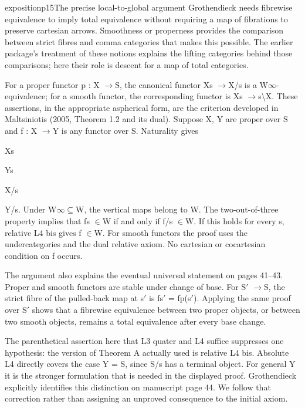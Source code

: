 \begin{dcomment}{exposition}{p15}{The precise local-to-global argument}
Grothendieck needs fibrewise equivalence to imply total equivalence without requiring a map of fibrations to preserve cartesian arrows. Smoothness or properness provides the comparison between strict fibres and comma categories that makes this possible. The earlier package’s treatment of these notions explains the lifting categories behind those comparisons; here their role is descent for a map of total categories.

For a proper functor p : X \ensuremath{\to}S, the canonical functor Xs \ensuremath{\to}X/s is a W\ensuremath{\infty}-equivalence; for a smooth functor, the corresponding functor is Xs \ensuremath{\to}s\textbackslash{}X. These assertions, in the appropriate aspherical form, are the criterion developed in Maltsiniotis (2005, Theorem 1.2 and its dual). Suppose X, Y are proper over S and f : X \ensuremath{\to}Y is any functor over S. Naturality gives

Xs

Ys

X/s

Y/s. Under W\ensuremath{\infty}\ensuremath{\subseteq}W, the vertical maps belong to W. The two-out-of-three property implies that fs \ensuremath{\in}W if and only if f/s \ensuremath{\in}W. If this holds for every s, relative L4 bis gives f \ensuremath{\in}W. For smooth functors the proof uses the undercategories and the dual relative axiom. No cartesian or cocartesian condition on f occurs.

The argument also explains the eventual universal statement on pages 41--43. Proper and smooth functors are stable under change of base. For S\ensuremath{\prime} \ensuremath{\to}S, the strict fibre of the pulled-back map at s\ensuremath{\prime} is fs\ensuremath{\prime} = fp(s\ensuremath{\prime}). Applying the same proof over S\ensuremath{\prime} shows that a fibrewise equivalence between two proper objects, or between two smooth objects, remains a total equivalence after every base change.

The parenthetical assertion here that L3 quater and L4 suffice suppresses one hypothesis: the version of Theorem A actually used is relative L4 bis. Absolute L4 directly covers the case Y = S, since S/s has a terminal object. For general Y it is the stronger formulation that is needed in the displayed proof. Grothendieck explicitly identifies this distinction on manuscript page 44. We follow that correction rather than assigning an unproved consequence to the initial axiom.

\end{dcomment}

